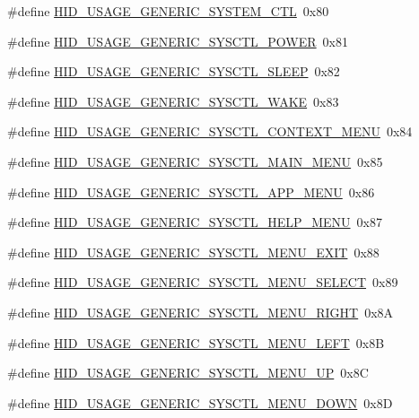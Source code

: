 \begin{DoxyCompactItemize}
\item 
\#define \hyperlink{group__USBD__HID_gad4265a946721f748c8d8afdddeadec45}{H\+I\+D\+\_\+\+U\+S\+A\+G\+E\+\_\+\+G\+E\+N\+E\+R\+I\+C\+\_\+\+S\+Y\+S\+T\+E\+M\+\_\+\+C\+TL}~0x80
\item 
\#define \hyperlink{group__USBD__HID_gaa12436658efedf9123a66b4b8e56475a}{H\+I\+D\+\_\+\+U\+S\+A\+G\+E\+\_\+\+G\+E\+N\+E\+R\+I\+C\+\_\+\+S\+Y\+S\+C\+T\+L\+\_\+\+P\+O\+W\+ER}~0x81
\item 
\#define \hyperlink{group__USBD__HID_gac73b2f6e789c3befc8a9acd70dcddee5}{H\+I\+D\+\_\+\+U\+S\+A\+G\+E\+\_\+\+G\+E\+N\+E\+R\+I\+C\+\_\+\+S\+Y\+S\+C\+T\+L\+\_\+\+S\+L\+E\+EP}~0x82
\item 
\#define \hyperlink{group__USBD__HID_ga638c72786880aa6c6af98e5bc45fe647}{H\+I\+D\+\_\+\+U\+S\+A\+G\+E\+\_\+\+G\+E\+N\+E\+R\+I\+C\+\_\+\+S\+Y\+S\+C\+T\+L\+\_\+\+W\+A\+KE}~0x83
\item 
\#define \hyperlink{group__USBD__HID_gaecbdbbdeb5d258f1e3a825422befb662}{H\+I\+D\+\_\+\+U\+S\+A\+G\+E\+\_\+\+G\+E\+N\+E\+R\+I\+C\+\_\+\+S\+Y\+S\+C\+T\+L\+\_\+\+C\+O\+N\+T\+E\+X\+T\+\_\+\+M\+E\+NU}~0x84
\item 
\#define \hyperlink{group__USBD__HID_gae2a1d26ba209e92cc8ce2865ef64dcdf}{H\+I\+D\+\_\+\+U\+S\+A\+G\+E\+\_\+\+G\+E\+N\+E\+R\+I\+C\+\_\+\+S\+Y\+S\+C\+T\+L\+\_\+\+M\+A\+I\+N\+\_\+\+M\+E\+NU}~0x85
\item 
\#define \hyperlink{group__USBD__HID_gaa73cbfdc8f380dcc3adda776b137bdf4}{H\+I\+D\+\_\+\+U\+S\+A\+G\+E\+\_\+\+G\+E\+N\+E\+R\+I\+C\+\_\+\+S\+Y\+S\+C\+T\+L\+\_\+\+A\+P\+P\+\_\+\+M\+E\+NU}~0x86
\item 
\#define \hyperlink{group__USBD__HID_gaa945bc70860e9c983e658077d494753b}{H\+I\+D\+\_\+\+U\+S\+A\+G\+E\+\_\+\+G\+E\+N\+E\+R\+I\+C\+\_\+\+S\+Y\+S\+C\+T\+L\+\_\+\+H\+E\+L\+P\+\_\+\+M\+E\+NU}~0x87
\item 
\#define \hyperlink{group__USBD__HID_gafc91a635055259c0d3a483d6c589c3be}{H\+I\+D\+\_\+\+U\+S\+A\+G\+E\+\_\+\+G\+E\+N\+E\+R\+I\+C\+\_\+\+S\+Y\+S\+C\+T\+L\+\_\+\+M\+E\+N\+U\+\_\+\+E\+X\+IT}~0x88
\item 
\#define \hyperlink{group__USBD__HID_gab64d10fd6ec3ea549ed4050169f93a4f}{H\+I\+D\+\_\+\+U\+S\+A\+G\+E\+\_\+\+G\+E\+N\+E\+R\+I\+C\+\_\+\+S\+Y\+S\+C\+T\+L\+\_\+\+M\+E\+N\+U\+\_\+\+S\+E\+L\+E\+CT}~0x89
\item 
\#define \hyperlink{group__USBD__HID_gac7f621deee3092ef3c2dd86dbb7b0ea8}{H\+I\+D\+\_\+\+U\+S\+A\+G\+E\+\_\+\+G\+E\+N\+E\+R\+I\+C\+\_\+\+S\+Y\+S\+C\+T\+L\+\_\+\+M\+E\+N\+U\+\_\+\+R\+I\+G\+HT}~0x8A
\item 
\#define \hyperlink{group__USBD__HID_gaa990f6e260ec95f96240ed8c4e36b05a}{H\+I\+D\+\_\+\+U\+S\+A\+G\+E\+\_\+\+G\+E\+N\+E\+R\+I\+C\+\_\+\+S\+Y\+S\+C\+T\+L\+\_\+\+M\+E\+N\+U\+\_\+\+L\+E\+FT}~0x8B
\item 
\#define \hyperlink{group__USBD__HID_ga02512a2347c4327b90c53f9385804385}{H\+I\+D\+\_\+\+U\+S\+A\+G\+E\+\_\+\+G\+E\+N\+E\+R\+I\+C\+\_\+\+S\+Y\+S\+C\+T\+L\+\_\+\+M\+E\+N\+U\+\_\+\+UP}~0x8C
\item 
\#define \hyperlink{group__USBD__HID_ga234727e438e810c8bf7d30a98c0ab2b0}{H\+I\+D\+\_\+\+U\+S\+A\+G\+E\+\_\+\+G\+E\+N\+E\+R\+I\+C\+\_\+\+S\+Y\+S\+C\+T\+L\+\_\+\+M\+E\+N\+U\+\_\+\+D\+O\+WN}~0x8D
\end{DoxyCompactItemize}
